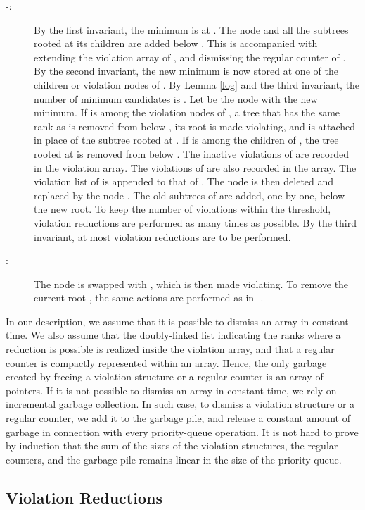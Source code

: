 \documentclass{llncs}
\newcommand{\Deletemin}{\mbox{\mbox{\rm -}}}
\newcommand{\Delete}{\mbox{}}
\begin{document}
\begin{description}
\item[\Deletemin{}:] By the first invariant, the minimum is at .
	The node  and all the subtrees rooted at its 
	children are added below . This is accompanied with extending the violation 
	array of , and dismissing the regular counter of .  
  By the second invariant, the new minimum is now stored at one of the children
  or violation nodes of .  By Lemma \ref{log} and the third
  invariant, the number of minimum candidates is .  Let  be
  the node with the new minimum. If  is among the violation nodes
  of , a tree that has the same rank as  is removed from below ,
  its root is made violating, and is attached in place of the subtree rooted at .
  If  is among the children of , the tree rooted at  is removed from below . 
  The inactive violations of  are recorded in the violation array. The violations of 
  are also recorded in the array.  
  The violation list of  is appended to that of . 
  The node  is then deleted and replaced by the node .
  The old subtrees of  are added, one by one, below the new root.  
  To keep the number of violations within the threshold, violation reductions are performed as many times as possible.
  By the third invariant, at most  violation reductions are to be performed.

\item[\Delete{}:] The node  is swapped with , which is then made violating. 
	To remove the current root , the same actions are performed as in \Deletemin{}.
\vspace{-.2in}	
\end{description}
  
In our description, we assume that it is possible to dismiss an array
in constant time.  We also assume that the doubly-linked list indicating
the ranks where a reduction is possible is realized inside the
violation array, and that a regular counter is compactly
represented within an array.  Hence, the only garbage created by
freeing a violation structure or a regular counter is an array of
pointers.  If it is not possible to dismiss an array in constant
time, we rely on incremental garbage collection.  In such case, to
dismiss a violation structure or a regular counter, we add it
to the garbage pile, and release a constant amount of garbage in
connection with every priority-queue operation.  It is not hard to
prove by induction that the sum of the sizes of the violation
structures, the regular counters, and the garbage pile
remains linear in the size of the priority queue.

\subsection*{Violation Reductions}
\end{document}
